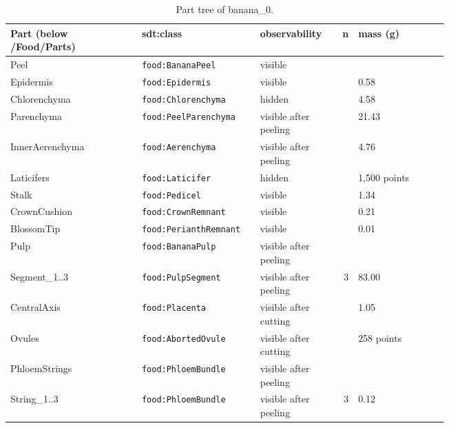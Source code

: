 \documentclass[10.5pt,a4paper]{article}
\begin{document}
\begin{table}[htbp]\centering\scriptsize\caption{Part tree of banana\_0.}
\begin{tabularx}{\linewidth}{@{}p{0.30\linewidth}p{0.27\linewidth}p{0.17\linewidth}rX@{}}\toprule Part (below /Food/Parts) & sdt:class & observability & n & mass (g) \\\midrule
\hspace*{0.0em}Peel & \texttt{food:BananaPeel} & visible &  &  \\
\hspace*{0.9em}Epidermis & \texttt{food:Epidermis} & visible &  & 0.58 \\
\hspace*{0.9em}Chlorenchyma & \texttt{food:Chlorenchyma} & hidden &  & 4.58 \\
\hspace*{0.9em}Parenchyma & \texttt{food:PeelParenchyma} & visible after peeling &  & 21.43 \\
\hspace*{0.9em}InnerAerenchyma & \texttt{food:Aerenchyma} & visible after peeling &  & 4.76 \\
\hspace*{0.9em}Laticifers & \texttt{food:Laticifer} & hidden &  & 1,500 points \\
\hspace*{0.0em}Stalk & \texttt{food:Pedicel} & visible &  & 1.34 \\
\hspace*{0.0em}CrownCushion & \texttt{food:CrownRemnant} & visible &  & 0.21 \\
\hspace*{0.0em}BlossomTip & \texttt{food:PerianthRemnant} & visible &  & 0.01 \\
\hspace*{0.0em}Pulp & \texttt{food:BananaPulp} & visible after peeling &  &  \\
\hspace*{0.9em}Segment\_1..3 & \texttt{food:PulpSegment} & visible after peeling & 3 & 83.00 \\
\hspace*{0.9em}CentralAxis & \texttt{food:Placenta} & visible after cutting &  & 1.05 \\
\hspace*{0.9em}Ovules & \texttt{food:AbortedOvule} & visible after cutting &  & 258 points \\
\hspace*{0.9em}PhloemStrings & \texttt{food:PhloemBundle} & visible after peeling &  &  \\
\hspace*{1.8em}String\_1..3 & \texttt{food:PhloemBundle} & visible after peeling & 3 & 0.12 \\\bottomrule\end{tabularx}\end{table}
\end{document}
